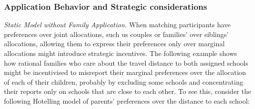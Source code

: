 \documentclass{article}
\begin{document}
\subsubsection{Application Behavior and Strategic considerations}

\textit{Static Model without Family Application.} When matching participants have preferences over joint allocations, such us couples or families' over siblings' allocations, allowing them to express their preferences only over marginal allocations might introduce strategic incentives. The following example shows how rational families who care about the travel distance to both assigned schools might be incentivised to misreport their marginal preferences over the allocation of each of their children, probably by excluding some schools and concentrating their reports only on schools that are close to each other. To see this, consider the following Hotelling model of parents' preferences over the distance to each school:



\vspace{1cm}
\end{document}
